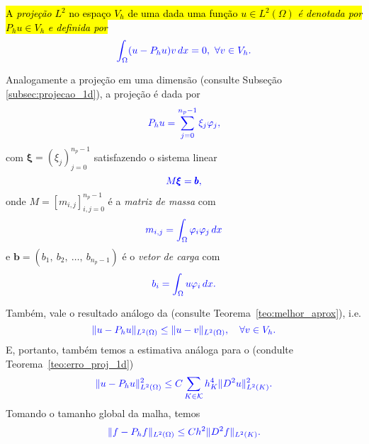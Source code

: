 \hl{A \emph{projeção} $L^2$ no espaço $V_h$ de uma dada uma função $u\in L^2(\Omega)$ \emph{é denotada por} $P_hu\in V_h$ \emph{e definida por}}
\begin{equation}\color{blue}\int_\Omega (u-P_hu)v\,dx = 0,~\forall v\in V_h.
\end{equation}

Analogamente a projeção em uma dimensão (consulte Subseção \ref{subsec:projecao_1d}), a projeção é dada por
\begin{equation}\color{blue}P_h u = \sum_{j=0}^{n_p-1} \xi_j\varphi_j,
\end{equation}
com $\pmb{\xi} = (\xi_j)_{j=0}^{n_p-1}$ satisfazendo o sistema linear
\begin{equation}\color{blue}M\pmb{\xi} = \pmb{b},
\end{equation}
onde $M = [m_{i,j}]_{i,j=0}^{n_p-1}$ é a \emph{matriz de massa} com
\begin{equation}\color{blue}m_{i,j} = \int_{\Omega} \varphi_i\varphi_j\,dx
\end{equation}
e $\pmb{b} = (b_1,~b_2,~\dotsc,~b_{n_p-1})$ é o \emph{vetor de carga} com
\begin{equation}\color{blue}b_i = \int_\Omega u\varphi_i\,dx.
\end{equation}

Também, vale o resultado análogo da  (consulte Teorema~\ref{teo:melhor_aprox}), i.e.
\begin{equation}\color{blue}\|u-P_hu\|_{L^2(\Omega)} \leq \|u - v\|_{L^2(\Omega)},\quad\forall v\in V_h.
\end{equation}
E, portanto, também temos a estimativa análoga para o  (condulte Teorema~\ref{teo:erro_proj_1d})
\begin{equation}\color{blue}\|u-P_hu\|_{L^2(\Omega)}^2 \leq C\sum_{K\in\mathcal{K}} h_K^4\|D^2 u\|_{L^2(K)}^2.
\end{equation}
Tomando o tamanho global da malha, temos
\begin{equation}\label{eq:erro_projec_2d}\color{blue}\|f-P_hf\|_{L^2(\Omega)} \leq Ch^2\|D^2 f\|_{L^2(K)}.
\end{equation}

